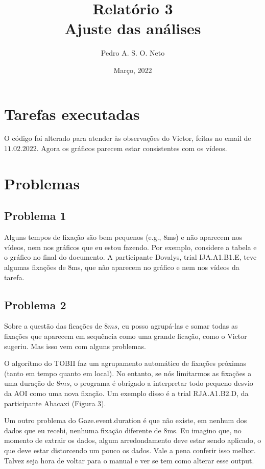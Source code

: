 \documentclass{article}
\title{Relatório 3 \\ Ajuste das análises}
\author{Pedro A. S. O. Neto}
\date{Março, 2022}
\begin{document}
\maketitle

\section{Tarefas executadas}

O código foi alterado para atender às observações do Victor, feitas no email de $11.02.2022$. Agora os gráficos parecem estar consistentes com os vídeos. 

\section{Problemas}

\subsection{Problema 1}
Alguns tempos de fixação são bem pequenos (e.g., 8ms) e não aparecem nos vídeos, nem nos gráficos que eu estou fazendo. Por exemplo, considere a tabela e o gráfico no final do documento. A participante Dovalys, trial IJA.A1.B1.E, teve algumas fixações de 8ms, que não aparecem no gráfico e nem nos vídeos da tarefa.

\subsection{Problema 2}
Sobre a questão das ficações de $8ms$, eu posso agrupá-las e somar todas as fixações que aparecem em sequência como uma grande ficação, como o Victor sugeriu. Mas isso vem com alguns problemas. 


O algorítmo do TOBII faz um agrupamento automático de fixações próximas (tanto em tempo quanto em local). No entanto, se nós limitarmos as fixações a uma duração de $8ms$, o programa é obrigado a interpretar todo pequeno desvio da AOI como uma nova fixação. Um exemplo disso é a trial RJA.A1.B2.D, da participante Abacaxi (Figura 3).

Um outro problema do Gaze.event.duration é que não existe, em nenhum dos dados que eu recebi, nenhuma fixação diferente de 8ms. Eu imagino que, no momento de extrair os dados, algum arredondamento deve estar sendo aplicado, o que deve estar distorcendo um pouco os dados. Vale a pena conferir isso melhor. Talvez seja hora de voltar para o manual e ver se tem como alterar esse output. 
\end{document}
